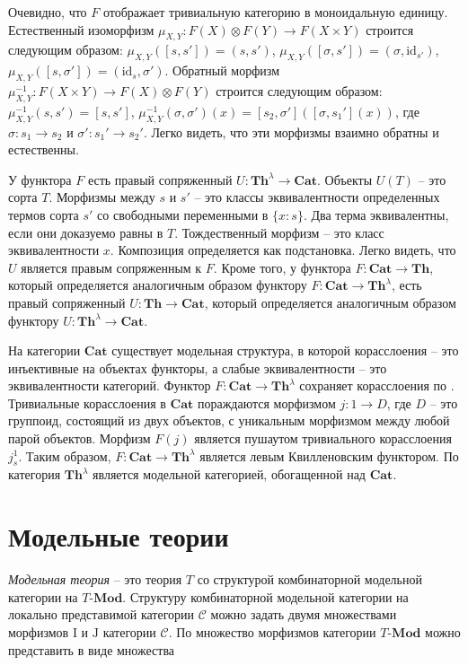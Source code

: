 \documentclass[reqno]{amsart}
\theoremstyle{definition}
\theoremstyle{remark}
\newcommand{\bcat}[1]{\mathbf{#1}}
\newcommand{\cat}[1]{\mathcal{#1}}
\renewcommand{\C}{\cat{C}}
\newcommand{\Mod}[1]{#1\text{-}\bcat{Mod}}
\newcommand{\fs}[1]{\mathrm{#1}}
\newcommand{\Th}{\bcat{Th}}
\newcommand{\Cat}{\bcat{Cat}}
\newcommand{\I}{\mathrm{I}}
\newcommand{\J}{\mathrm{J}}
\begin{document}
Очевидно, что $F$ отображает тривиальную категорию в моноидальную единицу.
Естественный изоморфизм $\mu_{X,Y} : F(X) \otimes F(Y) \to F(X \times Y)$ строится следующим образом: $\mu_{X,Y}([s,s']) = (s,s')$, $\mu_{X,Y}([\sigma,s']) = (\sigma,\fs{id}_{s'})$, $\mu_{X,Y}([s,\sigma']) = (\fs{id}_s,\sigma')$.
Обратный морфизм $\mu_{X,Y}^{-1} : F(X \times Y) \to F(X) \otimes F(Y)$ строится следующим образом: $\mu_{X,Y}^{-1}(s,s') = [s,s']$, $\mu_{X,Y}^{-1}(\sigma,\sigma')(x) = [s_2,\sigma']([\sigma,s_1'](x))$, где $\sigma : s_1 \to s_2$ и $\sigma' : s_1' \to s_2'$.
Легко видеть, что эти морфизмы взаимно обратны и естественны.

У функтора $F$ есть правый сопряженный $U : \Th^\lambda \to \Cat$.
Объекты $U(T)$ -- это сорта $T$.
Морфизмы между $s$ и $s'$ -- это классы эквивалентности определенных термов сорта $s'$ со свободными переменными в $\{ x : s \}$.
Два терма эквивалентны, если они доказуемо равны в $T$.
Тождественный морфизм -- это класс эквивалентности $x$.
Композиция определяется как подстановка.
Легко видеть, что $U$ является правым сопряженным к $F$.
Кроме того, у функтора $F : \Cat \to \Th$, который определяется аналогичным образом функтору $F : \Cat \to \Th^\lambda$, есть правый сопряженный $U : \Th \to \Cat$, который определяется аналогичным образом функтору $U : \Th^\lambda \to \Cat$.

На категории $\Cat$ существует модельная структура, в которой корасслоения -- это инъективные на объектах функторы, а слабые эквивалентности -- это эквивалентности категорий.
Функтор $F : \Cat \to \Th^\lambda$ сохраняет корасслоения по .
Тривиальные корасслоения в $\Cat$ пораждаются морфизмом $j : 1 \to D$, где $D$ -- это группоид, состоящий из двух объектов, с уникальным морфизмом между любой парой объектов.
Морфизм $F(j)$ является пушаутом тривиального корасслоения $j_s^1$.
Таким образом, $F : \Cat \to \Th^\lambda$ является левым Квилленовским функтором.
По \cite[Proposition~3.8]{enriched-model-cats} категория $\Th^\lambda$ является модельной категорией, обогащенной над $\Cat$.

\section{Модельные теории}

\emph{Модельная теория} -- это теория $T$ со структурой комбинаторной модельной категории на $\Mod{T}$.
Структуру комбинаторной модельной категории на локально представимой категории $\C$ можно задать двумя множествами морфизмов $\I$ и $\J$ категории $\C$.
По  множество морфизмов категории $\Mod{T}$ можно представить в виде множества 
\end{document}
